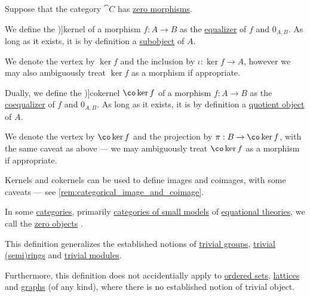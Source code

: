 \begin{definition}\label{def:categorical_kernels}
  Suppose that the category \( \cat{C} \) has \hyperref[def:zero_morphism]{zero morphisms}.

  \begin{thmenum}
     We define the \term[ru=ядро, en=kernel (\cite[191]{MacLane1998CategoryTheory})]{kernel} of a morphism \( f: A \to B \) as the \hyperref[def:categorical_equalizer]{equalizer} of \( f \) and \( 0_{A,B} \). As long as it exists, it is by definition a \hyperref[def:categorical_subobject]{subobject} of \( A \).

    We denote the vertex by \( \ker f \) and the inclusion by \( \iota: \ker f \to A \), however we may also ambiguously treat \( \ker f \) as a morphism if appropriate.

     Dually, we define the \term[ru=коядро, en=cokernel (\cite[191]{MacLane1998CategoryTheory})]{cokernel} \( \co\ker f \) of a morphism \( f: A \to B \) as the \hyperref[def:categorical_coequalizer]{coequalizer} of \( f \) and \( 0_{A,B} \). As long as it exists, it is by definition a \hyperref[def:categorical_quotient_object]{quotient object} of \( A \).

    We denote the vertex by \( \co\ker f \) and the projection by \( \pi: B \to \co\ker f \), with the same caveat as above --- we may ambiguously treat \( \co\ker f \) as a morphism if appropriate.
  \end{thmenum}
\end{definition}
\begin{comments}
  \item Kernels and cokernels can be used to define images and coimages, with some caveats --- see \cref{rem:categorical_image_and_coimage}.
\end{comments}

\begin{definition}\label{def:trivial_object}\mimprovised
  In some \hyperref[def:category]{categories}, primarily \hyperref[def:fol_theory_model_functor/obj]{categories of small models} of \hyperref[def:fol_equational_theory]{equational theories}, we call the \hyperref[def:universal_objects/zero]{zero objects} .
\end{definition}
\begin{comments}
  \item This definition generalizes the established notions of \hyperref[def:group/trivial]{trivial groups}, \hyperref[def:semiring/trivial]{trivial (semi)rings} and \hyperref[def:module/trivial]{trivial modules}.

  Furthermore, this definition does not accidentially apply to \hyperref[def:partially_ordered_set]{ordered sets}, \hyperref[def:lattice]{lattices} and \hyperref[rem:graph_of_unspecified_type]{graphs} (of any kind), where there is no established notion of trivial object.
\end{comments}

